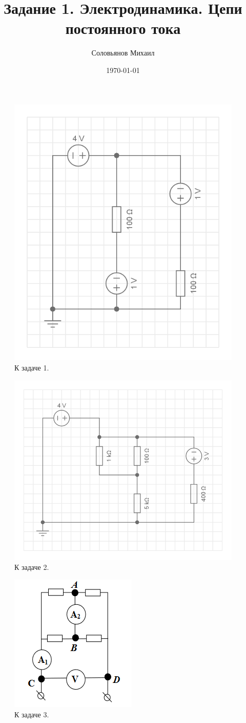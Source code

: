 \documentclass[a4paper,12pt]{article} %
\author{Соловьянов Михаил }
\title{Задание 1. Электродинамика.  Цепи постоянного тока}
\date{\today}
\begin{document}
\maketitle

\begin{figure}[H]
\centering
  \includegraphics[width=0.5\linewidth]{circuit1.png}
  \caption{К задаче 1.}
  \label{fig1}
\end{figure}



\begin{figure}[H]
\centering
  \includegraphics[width=0.5\linewidth]{circuit2.png}
  \caption{К задаче 2.}
  \label{fig2}
\end{figure}


\begin{figure}[H]
\centering
  \includegraphics[width=0.5\linewidth]{3.png}
  \caption{К задаче 3.}
  \label{fig3}
\end{figure}
\end{document}
